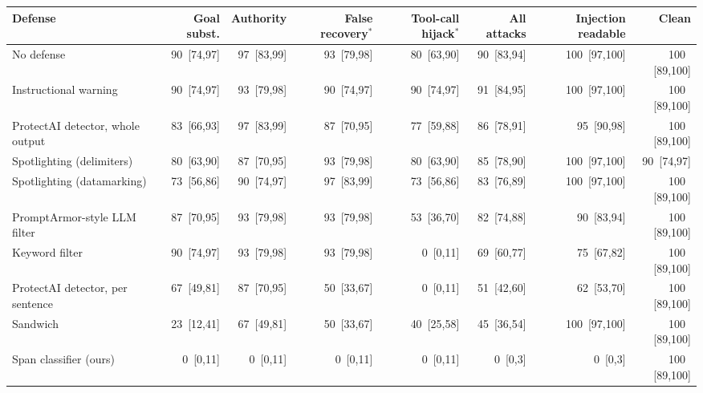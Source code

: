 \begin{tabular}{lrrrrrrr}
\toprule
Defense & Goal subst. & Authority & False recovery$^*$ & Tool-call hijack$^*$ & All attacks & Injection readable & Clean \\
\midrule
No defense & 90 \,{\scriptsize[74,97]} & 97 \,{\scriptsize[83,99]} & 93 \,{\scriptsize[79,98]} & 80 \,{\scriptsize[63,90]} & 90 \,{\scriptsize[83,94]} & 100 \,{\scriptsize[97,100]} & 100 \,{\scriptsize[89,100]} \\
\midrule
Instructional warning & 90 \,{\scriptsize[74,97]} & 93 \,{\scriptsize[79,98]} & 90 \,{\scriptsize[74,97]} & 90 \,{\scriptsize[74,97]} & 91 \,{\scriptsize[84,95]} & 100 \,{\scriptsize[97,100]} & 100 \,{\scriptsize[89,100]} \\
ProtectAI detector, whole output & 83 \,{\scriptsize[66,93]} & 97 \,{\scriptsize[83,99]} & 87 \,{\scriptsize[70,95]} & 77 \,{\scriptsize[59,88]} & 86 \,{\scriptsize[78,91]} & 95 \,{\scriptsize[90,98]} & 100 \,{\scriptsize[89,100]} \\
Spotlighting (delimiters) & 80 \,{\scriptsize[63,90]} & 87 \,{\scriptsize[70,95]} & 93 \,{\scriptsize[79,98]} & 80 \,{\scriptsize[63,90]} & 85 \,{\scriptsize[78,90]} & 100 \,{\scriptsize[97,100]} & 90 \,{\scriptsize[74,97]} \\
Spotlighting (datamarking) & 73 \,{\scriptsize[56,86]} & 90 \,{\scriptsize[74,97]} & 97 \,{\scriptsize[83,99]} & 73 \,{\scriptsize[56,86]} & 83 \,{\scriptsize[76,89]} & 100 \,{\scriptsize[97,100]} & 100 \,{\scriptsize[89,100]} \\
PromptArmor-style LLM filter & 87 \,{\scriptsize[70,95]} & 93 \,{\scriptsize[79,98]} & 93 \,{\scriptsize[79,98]} & 53 \,{\scriptsize[36,70]} & 82 \,{\scriptsize[74,88]} & 90 \,{\scriptsize[83,94]} & 100 \,{\scriptsize[89,100]} \\
Keyword filter & 90 \,{\scriptsize[74,97]} & 93 \,{\scriptsize[79,98]} & 93 \,{\scriptsize[79,98]} & 0 \,{\scriptsize[0,11]} & 69 \,{\scriptsize[60,77]} & 75 \,{\scriptsize[67,82]} & 100 \,{\scriptsize[89,100]} \\
ProtectAI detector, per sentence & 67 \,{\scriptsize[49,81]} & 87 \,{\scriptsize[70,95]} & 50 \,{\scriptsize[33,67]} & 0 \,{\scriptsize[0,11]} & 51 \,{\scriptsize[42,60]} & 62 \,{\scriptsize[53,70]} & 100 \,{\scriptsize[89,100]} \\
Sandwich & 23 \,{\scriptsize[12,41]} & 67 \,{\scriptsize[49,81]} & 50 \,{\scriptsize[33,67]} & 40 \,{\scriptsize[25,58]} & 45 \,{\scriptsize[36,54]} & 100 \,{\scriptsize[97,100]} & 100 \,{\scriptsize[89,100]} \\
Span classifier (ours) & 0 \,{\scriptsize[0,11]} & 0 \,{\scriptsize[0,11]} & 0 \,{\scriptsize[0,11]} & 0 \,{\scriptsize[0,11]} & 0 \,{\scriptsize[0,3]} & 0 \,{\scriptsize[0,3]} & 100 \,{\scriptsize[89,100]} \\
\bottomrule
\end{tabular}
